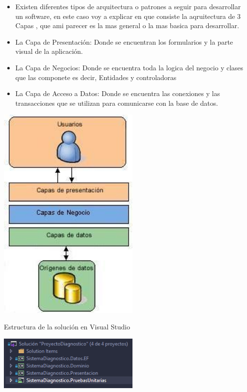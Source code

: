 \documentclass[preprint,12pt]{elsarticle}
\begin{document}
\begin{itemize}

\item Existen diferentes tipos de arquitectura o patrones a seguir para desarrollar un software, en este caso voy a explicar en que consiste la aqruitectura de 3 Capas , que ami parecer es la mas general o la mas basica para desarrollar.
\item La Capa de Presentación: Donde se encuentran los formularios y la parte visual de la aplicación.
\item	La Capa de Negocios: Donde se encuentra toda la logica del negocio y clases que las componete es decir, Entidades y controladoras
\item	La Capa de Acceso a Datos: Donde se encuentra las conexiones y las transacciones que se utilizan para comunicarse con la base de datos.
\end{itemize}
\begin{center}
\includegraphics[width=7cm]{./imagen/capas} 
\end{center}

Estructura de la solución en Visual Studio

\begin{center}
	\includegraphics[width=7cm]{./imagen/Screenshot_1.png} 
\end{center}
\end{document}
